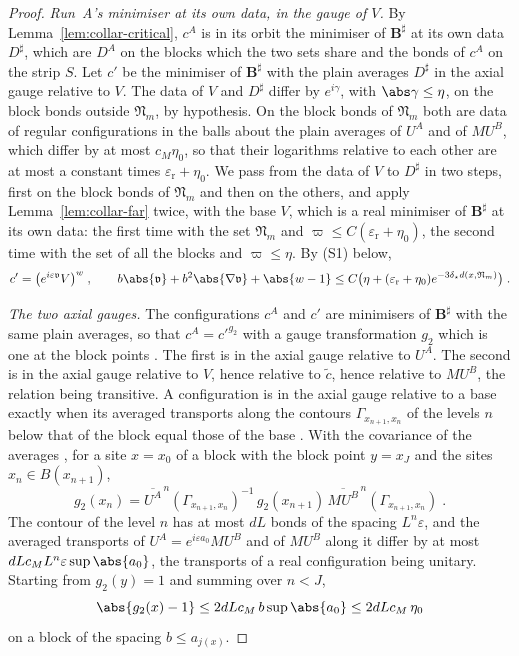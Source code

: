 \begin{proof}
\emph{Run~A's minimiser at its own data, in the gauge of $V$.} By Lemma~\ref{lem:collar-critical}, $c^A$ is in its orbit the minimiser of $\mathbf B^\sharp$ at its own data $D^\sharp$, which are $D^A$ on the blocks which the two sets share and the bonds of $c^A$ on the strip $S$. Let $c'$ be the minimiser of $\mathbf B^\sharp$ with the plain averages $D^\sharp$ in the axial gauge relative to $V$. The data of $V$ and $D^\sharp$ differ by $e^{i\gamma}$, with $\abs\gamma \leq \eta$, on the block bonds outside $\mathfrak N_m$, by hypothesis. On the block bonds of $\mathfrak N_m$ both are data of regular configurations in the balls about the plain averages of $U^A$ and of $MU^B$, which differ by at most $c_M\eta_0$, so that their logarithms relative to each other are at most a constant times $\varepsilon_{\mathrm r} + \eta_0$. We pass from the data of $V$ to $D^\sharp$ in two steps, first on the block bonds of $\mathfrak N_m$ and then on the others, and apply Lemma~\ref{lem:collar-far} twice, with the base $V$, which is a real minimiser of $\mathbf B^\sharp$ at its own data: the first time with the set $\mathfrak N_m$ and $\varpi \leq C(\varepsilon_{\mathrm r} + \eta_0)$, the second time with the set of all the blocks and $\varpi \leq \eta$. By (S1) below,
\[
    c' = \bigl(e^{i\varepsilon\mathfrak v}V\bigr)^w\;,
    \qquad
    b\abs{\mathfrak v} + b^2\abs{\nabla\mathfrak v} + \abs{w - 1} \leq C\bigl(\eta + (\varepsilon_{\mathrm r} + \eta_0)e^{-3\delta_\star d(x,\mathfrak N_m)}\bigr)\;.
\]

\emph{The two axial gauges.} The configurations $c^A$ and $c'$ are minimisers of $\mathbf B^\sharp$ with the same plain averages, so that $c^A = c'^{g_2}$ with a gauge transformation $g_2$ which is one at the block points \cite[(1.13), (1.14), p.~78]{BalabanREG}. The first is in the axial gauge relative to $U^A$. The second is in the axial gauge relative to $V$, hence relative to $\tilde c$, hence relative to $MU^B$, the relation being transitive. A configuration is in the axial gauge relative to a base exactly when its averaged transports along the contours $\Gamma_{x_{n+1},x_n}$ of the levels $n$ below that of the block equal those of the base \cite[(1.19), (1.20)]{BalabanREG}. With the covariance of the averages \cite[(70), p.~29]{BalabanAVG}, for a site $x = x_0$ of a block with the block point $y = x_J$ and the sites $x_n \in B(x_{n+1})$,
\[
    g_2(x_n) = \overline{U^A}^{\,n}(\Gamma_{x_{n+1},x_n})^{-1}\,g_2(x_{n+1})\,\overline{MU^B}^{\,n}(\Gamma_{x_{n+1},x_n})\;.
\]
The contour of the level $n$ has at most $dL$ bonds of the spacing $L^n\varepsilon$, and the averaged transports of $U^A = e^{i\varepsilon a_0}MU^B$ and of $MU^B$ along it differ by at most $dLc_ML^n\varepsilon\sup\abs{a_0}$, the transports of a real configuration being unitary. Starting from $g_2(y) = 1$ and summing over $n < J$,
\[
    \abs{g_2(x) - 1} \leq 2dLc_M\,b\sup\abs{a_0} \leq 2dLc_M\,\eta_0
\]
on a block of the spacing $b \leq a_{j(x)}$.


\end{proof}
